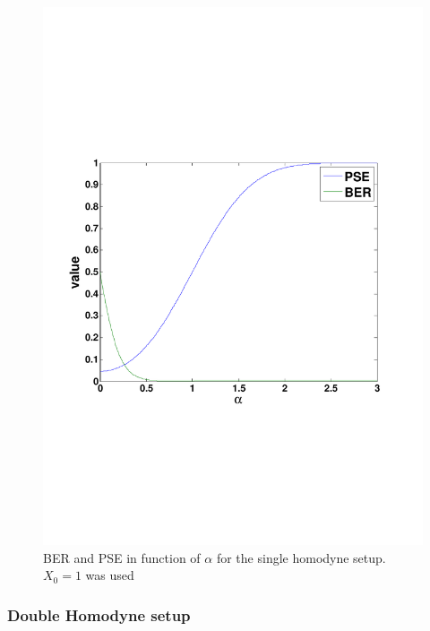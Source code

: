 \begin{figure}[h]
\centering
\includegraphics[width=\linewidth, trim= 0mm 60mm 0mm 70mm]{./sdf/cv_system/figures/singlehomodyne.pdf}
\caption{BER and PSE in function of $\alpha$ for the single homodyne setup. $X_0=1$ was used}
\label{fig:ber}
\end{figure}



\subsubsection*{Double Homodyne setup}

